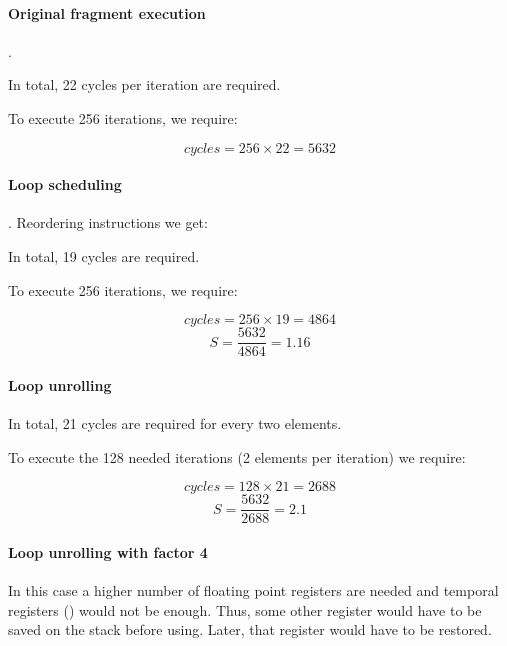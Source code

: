 \paragraph{Original fragment execution}.



In total, 22 cycles per iteration are required.

To execute 256 iterations, we require:

\[
cycles = 256 \times 22 = 5632
\]

\paragraph{Loop scheduling}.
Reordering instructions we get:



In total, 19 cycles are required.

To execute 256 iterations, we require:

\[
cycles = 256 \times 19 = 4864
\]
\[
S = \frac{5632}{4864} = 1.16
\]

\paragraph{Loop unrolling}



In total, 21 cycles are required for every two elements.

To execute the 128 needed iterations (2 elements per iteration) we require:

\[
cycles = 128 \times 21 = 2688
\]
\[
S = \frac{5632}{2688} = 2.1
\]

\paragraph{Loop unrolling with factor 4}

In this case a higher number of floating point registers are needed and
temporal registers () would not be enough.
Thus, some other register would have to be saved on the stack before using.
Later, that register would have to be restored.
